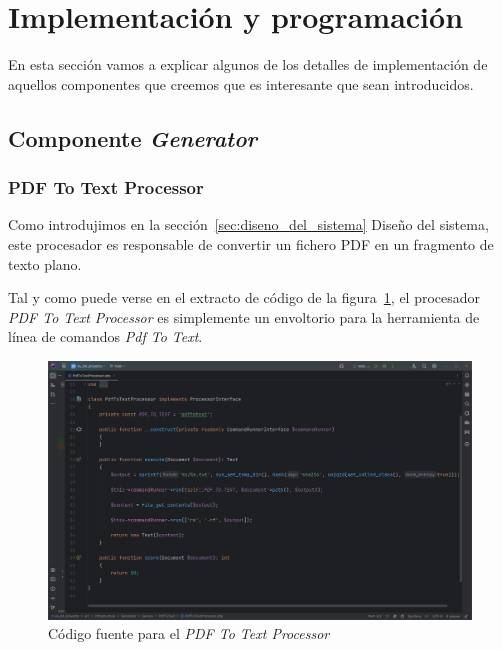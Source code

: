 \section{Implementación y programación}\label{sec:implemetacion_y_programacion}

En esta sección vamos a explicar algunos de los detalles de implementación de aquellos componentes que creemos que es
interesante que sean introducidos.

\subsection{Componente \textit{Generator}}

\subsubsection{PDF To Text Processor}

Como introdujimos en la sección~\ref{sec:diseno_del_sistema} Diseño del sistema, este procesador es responsable de
convertir un fichero PDF en un fragmento de texto plano.

Tal y como puede verse en el extracto de código de la figura~\ref{fig:chapter_4.4.pdf_to_text_processor}, el procesador
\textit{PDF To Text Processor} es simplemente un envoltorio para la herramienta de línea de comandos
\textit{Pdf To Text}.

\begin{figure}[ht]
    \begin{center}
        \includegraphics[width=\textwidth]{./chapter/4/images/chapter_4.4.pdf_to_text_processor}
        \caption{Código fuente para el \textit{PDF To Text Processor}}
        \label{fig:chapter_4.4.pdf_to_text_processor}
    \end{center}
\end{figure}

